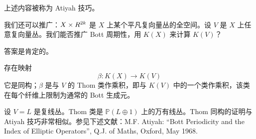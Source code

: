 
上述内容被称为 Atiyah 技巧。

我们还可以推广：$X\times R^{2k}$ 是 $X$ 上某个平凡复向量丛的全空间。设 $V$ 是 $X$ 上任意复向量丛。我们能否推广 Bott 周期性，用 $K(X)$ 来计算 $K(V)$？

答案是肯定的。

存在映射
\[ \beta: K(X)\to K(V) \]
它是同构；$\beta$ 是与 $V$ 的 Thom 类作乘积，即与 $K(V)$ 中的一个类作乘积，该类在每个纤维上限制为通常的 Bott 生成元。

设 $V=L$ 是复线丛。Thom 类是 $\mathbb{P}(L\oplus 1)$ 上的万有线丛。Thom 同构的证明与 Atiyah 技巧非常相似。参见下述文献：M.F. Atiyah: “Bott Periodicity and the Index of Elliptic Operators”, Q.J. of Maths, Oxford, May 1968.

